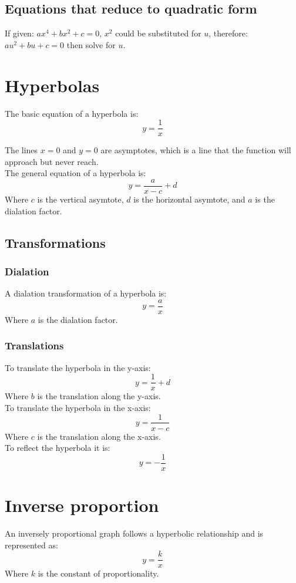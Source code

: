 \documentclass{report}
\begin{document}
\subsection{Equations that reduce to quadratic form}
If given: $ax^4 + bx^2 + c = 0$, $x^2$ could be substituted for $u$, therefore: $au^2 + bu + c = 0$ then solve for $u$.

\section{Hyperbolas}
The basic equation of a hyperbola is:
$$
	y = \frac{1}{x}
$$

The lines $x = 0$ and $y = 0$ are asymptotes, which is a line that the function will approach but never reach.\\

The general equation of a hyperbola is:
$$
	y = \frac{a}{x - c} + d
$$
Where $c$ is the vertical asymtote, $d$ is the horizontal asymtote, and $a$ is the dialation factor.

\subsection{Transformations}
\subsubsection{Dialation}
A dialation transformation of a hyperbola is:
$$
	y = \frac{a}{x}
$$
Where $a$ is the dialation factor.

\subsubsection{Translations}
To translate the hyperbola in the y-axis:
$$
	y = \frac{1}{x} + d
$$
Where $b$ is the translation along the y-axis.\\

To translate the hyperbola in the x-axis:
$$
	y = \frac{1}{x - c}
$$
Where $c$ is the translation along the x-axis.\\

To reflect the hyperbola it is:
$$
	y = -\frac{1}{x}
$$

\section{Inverse proportion}
An inversely proportional graph follows a hyperbolic relationship and is represented as:
$$
	y = \frac{k}{x}
$$
Where $k$ is the constant of proportionality.
\end{document}
